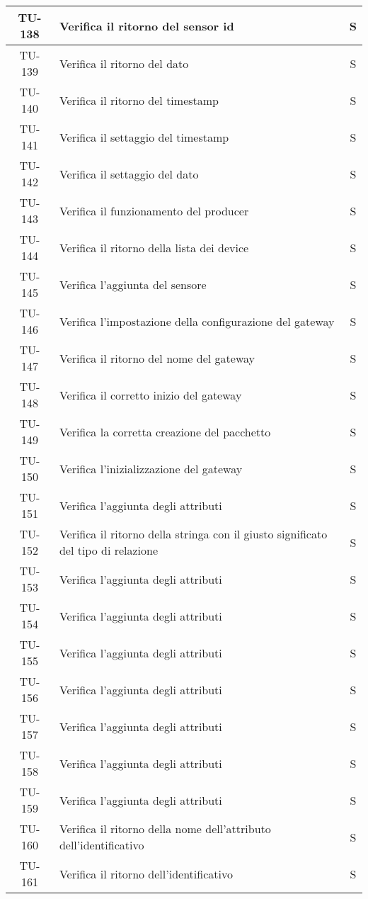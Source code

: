 \begin{center}
\begin{longtable}{|c|p{12cm}|c|}
			\hline
			TU-138 & Verifica il ritorno del sensor id & S \\
			\hline
			TU-139 & Verifica il ritorno del dato & S \\
			\hline
			TU-140 & Verifica il ritorno del timestamp & S \\
			\hline
			TU-141 & Verifica il settaggio del timestamp & S \\
			\hline
			TU-142 & Verifica il settaggio del dato & S \\
			\hline
			TU-143 & Verifica il funzionamento del producer & S \\
			\hline
			TU-144 & Verifica il ritorno della lista dei device & S \\
			\hline
			TU-145 & Verifica l'aggiunta del sensore & S \\
			\hline
			TU-146 & Verifica l'impostazione della configurazione del gateway & S \\
			\hline
			TU-147 & Verifica il ritorno del nome del gateway & S \\
			\hline
			TU-148 & Verifica il corretto inizio del gateway & S \\
			\hline
			TU-149 & Verifica la corretta creazione del pacchetto & S \\
			\hline
			TU-150 & Verifica l'inizializzazione del gateway & S \\
			\hline
			TU-151 & Verifica l'aggiunta degli attributi & S \\
			\hline
			TU-152 & Verifica il ritorno della stringa con il giusto significato del tipo di relazione & S \\
			\hline
			TU-153 & Verifica l'aggiunta degli attributi & S \\
			\hline
			TU-154 & Verifica l'aggiunta degli attributi & S \\
			\hline
			TU-155 & Verifica l'aggiunta degli attributi & S \\
			\hline
			TU-156 & Verifica l'aggiunta degli attributi & S \\
			\hline
			TU-157 & Verifica l'aggiunta degli attributi & S \\
			\hline
			TU-158 & Verifica l'aggiunta degli attributi & S \\
			\hline
			TU-159 & Verifica l'aggiunta degli attributi & S \\
			\hline
			TU-160 & Verifica il ritorno della nome dell'attributo dell'identificativo & S \\
			\hline
			TU-161 & Verifica il ritorno dell'identificativo & S \\

\end{longtable}
\end{center}
